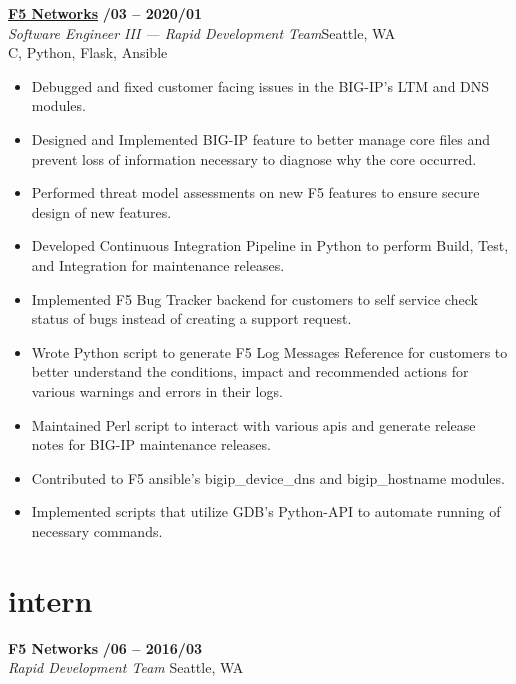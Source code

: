 \documentclass[margin,10pt]{res}
\begin{document}
\begin{resume}
    \href{https://www.f5.com/}{\textbf{F5 Networks}} \hfill \textsc{\bfseries{}/03 -- 2020/01}\\
    \textit{Software Engineer III --- Rapid Development Team}\hfill Seattle, WA\\
    C, Python, Flask, Ansible
    \begin{itemize}
        \item Debugged and fixed customer facing issues in the BIG-IP's LTM and DNS modules.
        \item Designed and Implemented BIG-IP feature to better manage core files and prevent loss of information necessary to
        diagnose why the core occurred.
        \item Performed threat model assessments on new F5 features to ensure secure design of new features.
        \item Developed Continuous Integration Pipeline in Python to perform Build, Test, and Integration for maintenance releases.
        \item Implemented F5 Bug Tracker backend for customers to self service check status of bugs instead of creating a support
        request.
        \item Wrote Python script to generate F5 Log Messages Reference for customers to better understand the conditions, impact
        and recommended actions for various warnings and errors in their logs.
        \item Maintained Perl script to interact with various apis and generate release notes for BIG-IP maintenance releases.
        \item Contributed to F5 ansible's bigip\_device\_dns and bigip\_hostname modules.
        \item Implemented scripts that utilize GDB's Python-API to automate running of necessary commands.
    \end{itemize}
\section{\sc \lsstyle intern}
    \textbf{F5 Networks} \hfill \textsc{\bfseries{}/06 -- 2016/03}\\
    \textit{Rapid Development Team} \hfill Seattle, WA


\end{resume}
\end{document}
